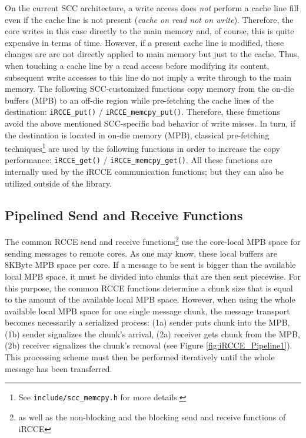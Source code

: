 \documentclass[fontsize=10pt, paper=a4, DIV12, pagesize=auto]{scrartcl}
\begin{document}
On the current SCC architecture, a write access does \emph{not} perform a cache line fill even if the cache line is not present (\emph{cache on read not on write}).
Therefore, the core writes in this case directly to the main memory and, of course, this is quite expensive in terms of time.
However, if a present cache line is modified, these changes are are not directly applied to main memory but just to the cache.
Thus, when touching a cache line by a read access before modifying its content, subsequent write accesses to this line do not imply a write through to the main memory.
The following SCC-customized functions copy memory from the on-die buffers (MPB) to an off-die region while pre-fetching the cache lines of the destination:
\texttt{iRCCE\_put()} / \texttt{iRCCE\_memcpy\_put()}.
Therefore, these functions avoid the above mentioned SCC-specific bad behavior of write misses.
In turn, if the destination is located in on-die memory (MPB), classical pre-fetching techniques\footnote{See \texttt{include/scc\_memcpy.h} for more details.} are used by the following functions in order to increase the copy performance:
\texttt{iRCCE\_get()} / \texttt{iRCCE\_memcpy\_get()}.
All these functions are internally used by the iRCCE communication functions; but they can also be utilized outside of the library.


\subsection{Pipelined Send and Receive Functions}\label{sec:improvements:pipeline}

The common RCCE send and receive functions\footnote{as well as the non-blocking and the blocking send and receive functions of iRCCE} use the core-local MPB space for sending messages to remote cores.
As one may know, these local buffers are 8KByte MPB space per core.
If a message to be sent is bigger than the available local MPB space, it must be divided into chunks that are then sent piecewise.
For this purpose, the common RCCE functions determine a chunk size that is equal to the amount of the available local MPB space.
However, when using the whole available local MPB space for one single message chunk, the message transport becomes necessarily a serialized process: (1a) sender puts chunk into the MPB, (1b) sender signalizes the chunk's arrival, (2a) receiver gets chunk from the MPB, (2b) receiver signalizes the chunk's removal (see Figure \ref{fig:iRCCE_Pipeline1}).
This processing scheme must then be performed iteratively until the whole message has been transferred.
\end{document}
